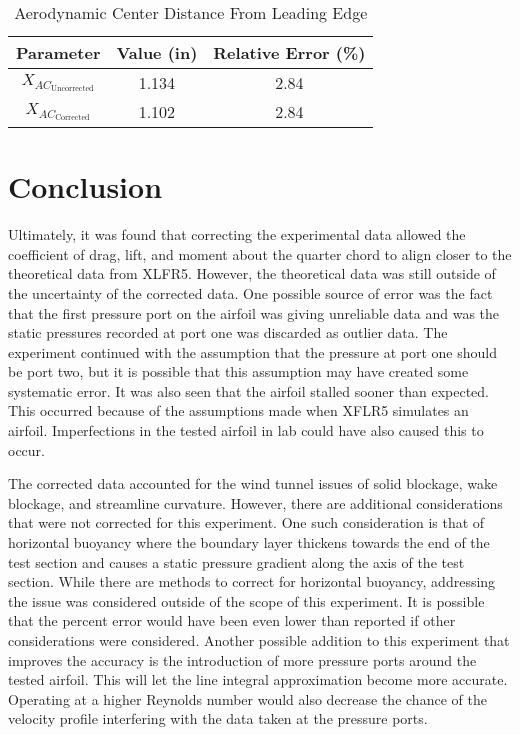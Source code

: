 \documentclass[journal,letterpaper]{IEEEtran}
\renewcommand{\arraystretch}{1.3}
\begin{document}
\begin{table}[H]
    \centering
    \caption{Aerodynamic Center Distance From Leading Edge}
    \renewcommand{\arraystretch}{1.2}
    \begin{tabular}{ccc}
    \toprule
    Parameter & Value (in) & Relative Error (\%) \\ \midrule \midrule
    $X_{AC_\text{Uncorrected}}$ & 1.134 & 2.84 \\
    $X_{AC_\text{Corrected}}$ & 1.102 & 2.84 \\ \bottomrule
    \end{tabular}
    \label{tab:center}
\end{table}


\section{Conclusion}


Ultimately, it was found that correcting the experimental data allowed the coefficient of drag, lift, and moment about the quarter chord to align closer to the theoretical data from XLFR5.
However, the theoretical data was still outside of the uncertainty of the corrected data.
One possible source of error was the fact that the first pressure port on the airfoil was giving unreliable data and was the static pressures recorded at port one was discarded as outlier data.
The experiment continued with the assumption that the pressure at port one should be port two, but it is possible that this assumption may have created some systematic error.
It was also seen that the airfoil stalled sooner than expected.
This occurred because of the assumptions made when XFLR5 simulates an airfoil.
Imperfections in the tested airfoil in lab could have also caused this to occur.

The corrected data accounted for the wind tunnel issues of solid blockage, wake blockage, and streamline curvature.
However, there are additional considerations that were not corrected for this experiment.
One such consideration is that of horizontal buoyancy where the boundary layer thickens towards the end of the test section and causes a static pressure gradient along the axis of the test section.
While there are methods to correct for horizontal buoyancy, addressing the issue was considered outside of the scope of this experiment.
It is possible that the percent error would have been even lower than reported if other considerations were considered.
Another possible addition to this experiment that improves the accuracy is the introduction of more pressure ports around the tested airfoil.
This will let the line integral approximation become more accurate.
Operating at a higher Reynolds number would also decrease the chance of the velocity profile interfering with the data taken at the pressure ports.
\end{document}
